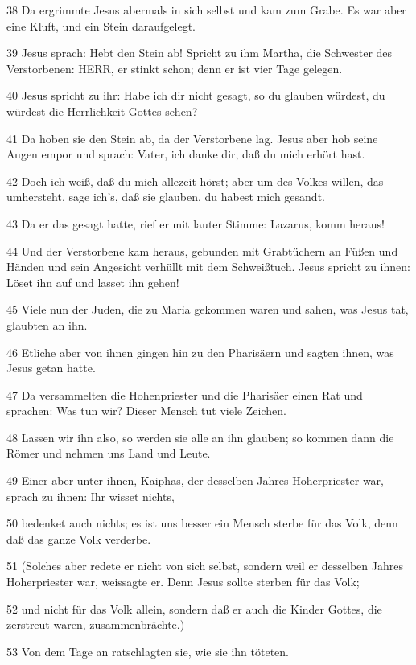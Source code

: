 \par 38 Da ergrimmte Jesus abermals in sich selbst und kam zum Grabe. Es war aber eine Kluft, und ein Stein daraufgelegt.
\par 39 Jesus sprach: Hebt den Stein ab! Spricht zu ihm Martha, die Schwester des Verstorbenen: HERR, er stinkt schon; denn er ist vier Tage gelegen.
\par 40 Jesus spricht zu ihr: Habe ich dir nicht gesagt, so du glauben würdest, du würdest die Herrlichkeit Gottes sehen?
\par 41 Da hoben sie den Stein ab, da der Verstorbene lag. Jesus aber hob seine Augen empor und sprach: Vater, ich danke dir, daß du mich erhört hast.
\par 42 Doch ich weiß, daß du mich allezeit hörst; aber um des Volkes willen, das umhersteht, sage ich's, daß sie glauben, du habest mich gesandt.
\par 43 Da er das gesagt hatte, rief er mit lauter Stimme: Lazarus, komm heraus!
\par 44 Und der Verstorbene kam heraus, gebunden mit Grabtüchern an Füßen und Händen und sein Angesicht verhüllt mit dem Schweißtuch. Jesus spricht zu ihnen: Löset ihn auf und lasset ihn gehen!
\par 45 Viele nun der Juden, die zu Maria gekommen waren und sahen, was Jesus tat, glaubten an ihn.
\par 46 Etliche aber von ihnen gingen hin zu den Pharisäern und sagten ihnen, was Jesus getan hatte.
\par 47 Da versammelten die Hohenpriester und die Pharisäer einen Rat und sprachen: Was tun wir? Dieser Mensch tut viele Zeichen.
\par 48 Lassen wir ihn also, so werden sie alle an ihn glauben; so kommen dann die Römer und nehmen uns Land und Leute.
\par 49 Einer aber unter ihnen, Kaiphas, der desselben Jahres Hoherpriester war, sprach zu ihnen: Ihr wisset nichts,
\par 50 bedenket auch nichts; es ist uns besser ein Mensch sterbe für das Volk, denn daß das ganze Volk verderbe.
\par 51 (Solches aber redete er nicht von sich selbst, sondern weil er desselben Jahres Hoherpriester war, weissagte er. Denn Jesus sollte sterben für das Volk;
\par 52 und nicht für das Volk allein, sondern daß er auch die Kinder Gottes, die zerstreut waren, zusammenbrächte.)
\par 53 Von dem Tage an ratschlagten sie, wie sie ihn töteten.
